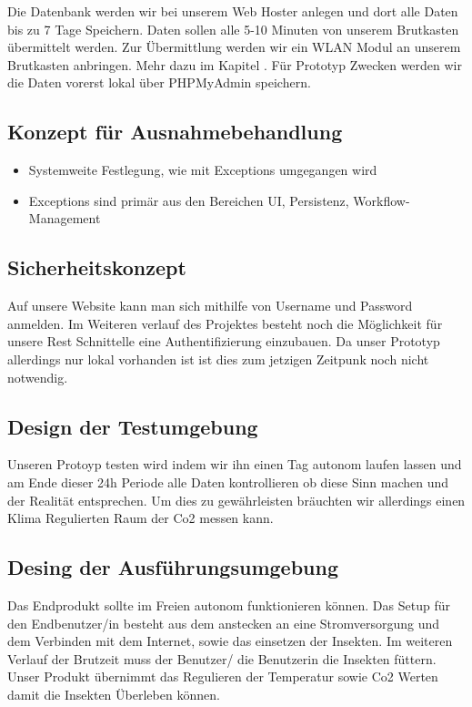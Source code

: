 	\newline
	Die Datenbank werden wir bei unserem Web Hoster anlegen und dort alle Daten bis zu 7 Tage Speichern. Daten sollen alle 5-10 Minuten von unserem Brutkasten übermittelt werden. Zur Übermittlung werden wir ein WLAN Modul an unserem Brutkasten anbringen. Mehr dazu im Kapitel . Für Prototyp Zwecken werden wir die Daten vorerst lokal über PHPMyAdmin speichern.
	\newpage
	\def \currentAuthor{}
\subsection{Konzept für Ausnahmebehandlung}
\begin{itemize}
	\item Systemweite Festlegung, wie mit Exceptions umgegangen wird
	\item Exceptions sind primär aus den Bereichen UI, Persistenz, Workflow-Management
\end{itemize}
	\newpage
	\def \currentAuthor{Florian Tipotsch}
\subsection{Sicherheitskonzept}

Auf unsere Website kann man sich mithilfe von Username und Password anmelden. Im Weiteren verlauf des Projektes besteht noch die Möglichkeit für unsere Rest Schnittelle eine Authentifizierung einzubauen. Da unser Prototyp allerdings nur lokal vorhanden ist ist dies zum jetzigen Zeitpunk noch nicht notwendig.

\subsection{Design der Testumgebung}
Unseren Protoyp testen wird indem wir ihn einen Tag autonom laufen lassen und am Ende dieser 24h Periode alle Daten kontrollieren ob diese Sinn machen und der Realität entsprechen. Um dies zu gewährleisten bräuchten wir allerdings einen Klima Regulierten Raum der Co2 messen kann.

\subsection{Desing der Ausführungsumgebung}
Das Endprodukt sollte im Freien autonom funktionieren können. Das Setup für den Endbenutzer/in besteht aus dem anstecken an eine Stromversorgung und dem Verbinden mit dem Internet, sowie das einsetzen der Insekten. Im weiteren Verlauf der Brutzeit muss der Benutzer/ die Benutzerin die Insekten füttern. Unser Produkt übernimmt das Regulieren der Temperatur sowie Co2 Werten damit die Insekten Überleben können.

